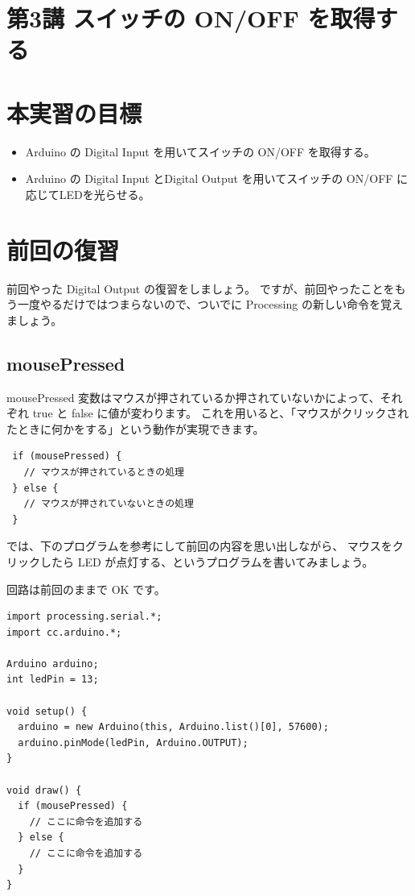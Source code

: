 \documentclass[11pt,a4paper]{jarticle}
\begin{document}
\section*{\LARGE{第3講 スイッチの ON/OFF を取得する}}
\section{本実習の目標}
\begin{itemize}
 \item Arduino の Digital Input を用いてスイッチの ON/OFF を取得する。
 \item Arduino の Digital Input とDigital Output を用いてスイッチの ON/OFF に応じてLEDを光らせる。
\end{itemize}


\section{前回の復習}
前回やった Digital Output の復習をしましょう。
ですが、前回やったことをもう一度やるだけではつまらないので、ついでに Processing の新しい命令を覚えましょう。

\subsection*{mousePressed}
mousePressed 変数はマウスが押されているか押されていないかによって、それぞれ true と false に値が変わります。
これを用いると、「マウスがクリックされたときに何かをする」という動作が実現できます。

\begin{lstlisting}
 if (mousePressed) {
   // マウスが押されているときの処理
 } else {
   // マウスが押されていないときの処理
 }
\end{lstlisting}

では、下のプログラムを参考にして前回の内容を思い出しながら、
マウスをクリックしたら LED が点灯する、というプログラムを書いてみましょう。

回路は前回のままで OK です。

\begin{lstlisting}
import processing.serial.*;
import cc.arduino.*;
 
Arduino arduino;
int ledPin = 13;
 
void setup() {
  arduino = new Arduino(this, Arduino.list()[0], 57600);
  arduino.pinMode(ledPin, Arduino.OUTPUT);
}
 
void draw() {
  if (mousePressed) {
    // ここに命令を追加する
  } else {
    // ここに命令を追加する
  }
}
\end{lstlisting}
\end{document}
